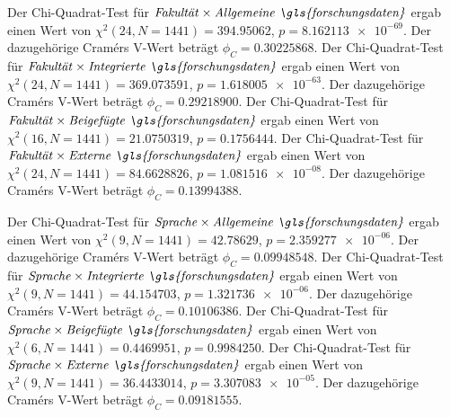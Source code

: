 Der Chi-Quadrat-Test für $\text{\textit{Fakultät}}\times\text{\textit{Allgemeine \gls{forschungsdaten}}}$ ergab einen Wert von $\chi^2 (\num{24}, N = \num{1441}) = \num[round-mode=places,round-precision=3]{394.95062}$, $p = \num[round-mode=places,round-precision=3]{8.162113e-69}$.
Der dazugehörige Cramérs V-Wert beträgt $\phi_C=\num[round-mode=places,round-precision=3]{0.30225868}$.
Der Chi-Quadrat-Test für $\text{\textit{Fakultät}}\times\text{\textit{Integrierte \gls{forschungsdaten}}}$ ergab einen Wert von $\chi^2 (\num{24}, N = \num{1441}) = \num[round-mode=places,round-precision=3]{369.073591}$, $p = \num[round-mode=places,round-precision=3]{1.618005e-63}$.
Der dazugehörige Cramérs V-Wert beträgt $\phi_C=\num[round-mode=places,round-precision=3]{0.29218900}$.
Der Chi-Quadrat-Test für $\text{\textit{Fakultät}}\times\text{\textit{Beigefügte \gls{forschungsdaten}}}$ ergab einen Wert von $\chi^2 (\num{16}, N = \num{1441}) = \num[round-mode=places,round-precision=3]{21.0750319}$, $p = \num[round-mode=places,round-precision=3]{0.1756444}$.
Der Chi-Quadrat-Test für $\text{\textit{Fakultät}}\times\text{\textit{Externe \gls{forschungsdaten}}}$ ergab einen Wert von $\chi^2 (\num{24}, N = \num{1441}) = \num[round-mode=places,round-precision=3]{84.6628826}$, $p = \num[round-mode=places,round-precision=3]{1.081516e-08}$.
Der dazugehörige Cramérs V-Wert beträgt $\phi_C=\num[round-mode=places,round-precision=3]{0.13994388}$.

Der Chi-Quadrat-Test für $\text{\textit{Sprache}}\times\text{\textit{Allgemeine \gls{forschungsdaten}}}$ ergab einen Wert von $\chi^2 (\num{9}, N = \num{1441}) = \num[round-mode=places,round-precision=3]{42.78629}$, $p = \num[round-mode=places,round-precision=3]{2.359277e-06}$.
Der dazugehörige Cramérs V-Wert beträgt $\phi_C=\num[round-mode=places,round-precision=3]{0.09948548}$.
Der Chi-Quadrat-Test für $\text{\textit{Sprache}}\times\text{\textit{Integrierte \gls{forschungsdaten}}}$ ergab einen Wert von $\chi^2 (\num{9}, N = \num{1441}) = \num[round-mode=places,round-precision=3]{44.154703}$, $p = \num[round-mode=places,round-precision=3]{1.321736e-06}$.
Der dazugehörige Cramérs V-Wert beträgt $\phi_C=\num[round-mode=places,round-precision=3]{0.10106386}$.
Der Chi-Quadrat-Test für $\text{\textit{Sprache}}\times\text{\textit{Beigefügte \gls{forschungsdaten}}}$ ergab einen Wert von $\chi^2 (\num{6}, N = \num{1441}) = \num[round-mode=places,round-precision=3]{0.4469951}$, $p = \num[round-mode=places,round-precision=3]{0.9984250}$.
Der Chi-Quadrat-Test für $\text{\textit{Sprache}}\times\text{\textit{Externe \gls{forschungsdaten}}}$ ergab einen Wert von $\chi^2 (\num{9}, N = \num{1441}) = \num[round-mode=places,round-precision=3]{36.4433014}$, $p = \num[round-mode=places,round-precision=3]{3.307083e-05}$.
Der dazugehörige Cramérs V-Wert beträgt $\phi_C=\num[round-mode=places,round-precision=3]{0.09181555}$.

